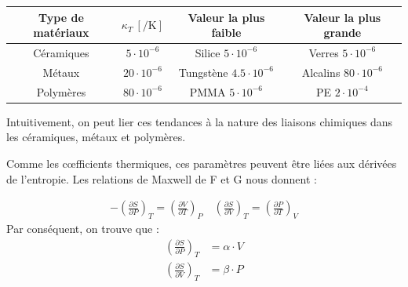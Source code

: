 \documentclass[a4paper]{book}
\begin{document}
\begin{center}
\begin{minipage}{0.6\textwidth}
\centering
\begin{tabular}{cccc}
\toprule
Type de matériaux & $\kappa_T ~ [\si{\per\kelvin}]$ & Valeur la plus faible & Valeur la plus grande \\
\midrule
Céramiques & $5 \cdot 10^{-6}$ & Silice $5 \cdot 10^{-6}$ & Verres $5 \cdot 10^{-6}$ \\
Métaux & $20 \cdot 10^{-6}$ & Tungstène $4.5 \cdot 10^{-6}$ & Alcalins $80 \cdot 10^{-6}$\\
Polymères & $80 \cdot 10^{-6}$ & PMMA $5 \cdot 10^{-6}$ & PE $2 \cdot 10^{-4}$\\
\bottomrule
\end{tabular}
\label{tab:Chp1-coef_dilatation}
\end{minipage}
\end{center}

Intuitivement, on peut lier ces tendances à la nature des liaisons chimiques dans les céramiques, métaux et polymères.

Comme les c{\oe}fficients thermiques, ces paramètres peuvent être liées aux dérivées de l'entropie. Les relations de Maxwell de F et G nous donnent : 

\begin{align*}
- \left( \frac{\partial S}{\partial P} \right)_T = \left( \frac{\partial V}{\partial T} \right)_P \quad \left( \frac{\partial S}{\partial V} \right)_T = \left( \frac{\partial P}{\partial T} \right)_V 
\end{align*}
Par conséquent, on trouve que : 
\begin{align*}
\left( \frac{\partial S}{\partial P} \right)_T &= \alpha \cdot V \\
\left( \frac{\partial S}{\partial V} \right)_T &= \beta \cdot P
\end{align*}

\end{document}
